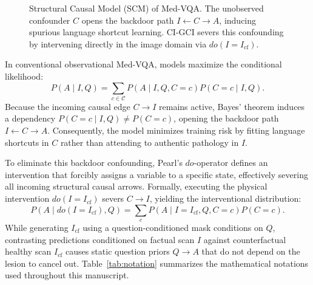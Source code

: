 \documentclass[journal,twoside,web]{ieeecolor}
\begin{document}
\begin{figure}[h]
\centering
{}
\caption{Structural Causal Model (SCM) of Med-VQA. The unobserved confounder $C$ opens the backdoor path $I \leftarrow C \rightarrow A$, inducing spurious language shortcut learning. CI-GCI severs this confounding by intervening directly in the image domain via $do(I = I_{\text{cf}})$.}
\label{fig:dag}
\end{figure}

In conventional observational Med-VQA, models maximize the conditional likelihood:
\begin{equation}
P(A \mid I, Q) = \sum_{c \in \mathcal{C}} P(A \mid I, Q, C=c) P(C=c \mid I, Q).
\label{eq:obs_confounding}
\end{equation}
Because the incoming causal edge $C \rightarrow I$ remains active, Bayes' theorem induces a dependency $P(C=c \mid I, Q) \ne P(C=c)$, opening the backdoor path $I \longleftarrow C \longrightarrow A$. Consequently, the model minimizes training risk by fitting language shortcuts in $C$ rather than attending to authentic pathology in $I$.

To eliminate this backdoor confounding, Pearl's $do$-operator defines an intervention that forcibly assigns a variable to a specific state, effectively severing all incoming structural causal arrows. Formally, executing the physical intervention $do(I = I_{\text{cf}})$ severs $C \to I$, yielding the interventional distribution:
\begin{equation}
P(A \mid do(I=I_{\text{cf}}), Q) = \sum_{c} P(A \mid I=I_{\text{cf}}, Q, C=c) P(C=c).
\label{eq:do_calculus}
\end{equation}
While generating $I_{\text{cf}}$ using a question-conditioned mask conditions on $Q$, contrasting predictions conditioned on factual scan $I$ against counterfactual healthy scan $I_{\text{cf}}$ causes static question priors $Q \to A$ that do not depend on the lesion to cancel out. Table~\ref{tab:notation} summarizes the mathematical notations used throughout this manuscript.
\end{document}
